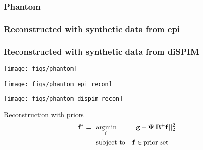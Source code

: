 \documentclass[presentation]{beamer}
\begin{document}
\begin{frame}
\frametitle<1>{Phantom}
\frametitle<2>{Reconstructed with synthetic data from epi}
\frametitle<3>{Reconstructed with synthetic data from diSPIM}

\begin{overprint}
  \centerline{\texttt{[image: figs/phantom]}}%
  \centerline{\texttt{[image: figs/phantom\_epi\_recon]}}%
  \centerline{\texttt{[image: figs/phantom\_dispim\_recon]}}%
\end{overprint}
\end{frame}


\begin{frame}{Reconstruction with priors}
    \begin{equation*}
    \begin{aligned}
      \mathbf{f^*} =\ \  
    & \underset{\mathbf{f}}{\text{argmin}}
    & & ||\mathbf{g} - \mathbf{\Psi}\thinspace\mathbf{B}^+\mathbf{f}||_2^2 \\
    & \text{subject to}
    & & \mathbf{f} \in \text{prior set}
    \end{aligned}
  \end{equation*}
\end{frame}

\end{document}
